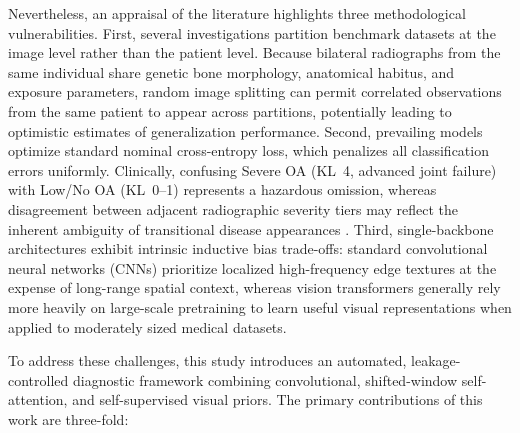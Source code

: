 \documentclass[10pt,journal]{IEEEtran}
\begin{document}
Nevertheless, an appraisal of the literature highlights three methodological vulnerabilities. First, several investigations partition benchmark datasets at the image level rather than the patient level. Because bilateral radiographs from the same individual share genetic bone morphology, anatomical habitus, and exposure parameters, random image splitting can permit correlated observations from the same patient to appear across partitions, potentially leading to optimistic estimates of generalization performance. Second, prevailing models optimize standard nominal cross-entropy loss, which penalizes all classification errors uniformly. Clinically, confusing Severe OA (KL~4, advanced joint failure) with Low/No OA (KL~0--1) represents a hazardous omission, whereas disagreement between adjacent radiographic severity tiers may reflect the inherent ambiguity of transitional disease appearances \cite{sheehy2015validity, zhang2010eular}. Third, single-backbone architectures exhibit intrinsic inductive bias trade-offs: standard convolutional neural networks (CNNs) prioritize localized high-frequency edge textures at the expense of long-range spatial context, whereas vision transformers generally rely more heavily on large-scale pretraining to learn useful visual representations when applied to moderately sized medical datasets.

To address these challenges, this study introduces an automated, leakage-controlled diagnostic framework combining convolutional, shifted-window self-attention, and self-supervised visual priors. The primary contributions of this work are three-fold:
\end{document}

